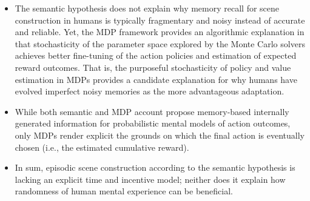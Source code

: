 \documentclass[10pt,letterpaper]{article}
\begin{document}
\begin{itemize}
  \item The semantic hypothesis does not explain why memory recall
  for scene construction in humans is typically fragmentary and noisy
  instead of accurate and reliable.
  Yet, the MDP framework provides an algorithmic explanation in that
  stochasticity of the parameter space explored
  by the Monte Carlo solvers achieves better fine-tuning of the
  action policies and estimation of expected reward outcomes.
  That is, the purposeful stochasticity of policy and value estimation
  in MDPs provides a candidate explanation for why humans
  have evolved imperfect noisy memories
  as the more advantageous adaptation.
  \item While both semantic and MDP account propose memory-based internally
  generated information for probabilistic mental models of action outcomes,
  only MDPs render explicit the grounds on which the final action is
  eventually chosen (i.e., the estimated cumulative reward).
  \item In sum, episodic scene construction according to the semantic
  hypothesis is lacking an explicit time and incentive model;
  neither does it explain how randomness of human mental experience
  can be beneficial.
\end{itemize}
\end{document}
